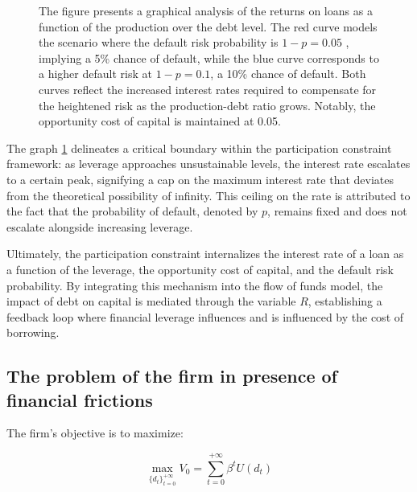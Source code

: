 \documentclass[12pt]{report}
\begin{document}
\begin{figure}
    \caption{The figure presents a graphical analysis of the returns on loans as a function of the production over the
    debt level. The red curve models the scenario where the default risk probability is 
    \(1-p=0.05\)
    , implying a 5\% chance of default, while the blue curve corresponds to a higher default risk at 
    \(1-p=0.1\), a 10\% chance of default. Both curves reflect the increased interest rates required to compensate for
    the heightened risk as the production-debt ratio grows. Notably, the opportunity cost of capital is maintained at 0.05.
    }
    \label{plot:part_constraint_r_fixlavarge}
\end{figure}
The graph \ref{plot:part_constraint_r_fixlavarge} delineates a critical boundary within the participation constraint framework: as leverage approaches
unsustainable levels, the interest rate escalates to a certain peak, signifying a cap on the maximum interest rate that
deviates from the theoretical possibility of infinity. This ceiling on the rate is attributed to the fact that the
probability of default, denoted by \( p \), remains fixed and does not escalate alongside increasing leverage. 

Ultimately, the participation constraint internalizes the interest rate of a loan as a function of the leverage, the
opportunity cost of capital, and the default risk probability. By integrating this mechanism into the flow of funds
model, the impact of debt on capital is mediated through the variable \( R \), establishing a feedback loop where
financial leverage influences and is influenced by the cost of borrowing. 




\subsection{The problem of the firm in presence of financial frictions}
 The firm's objective is to maximize:

\[
\max_{{\{d_{t}\}}_{t=0}^{+\infty}}V_0 = \sum_{t=0}^{+\infty}{\beta^t U(d_t)}
\]
\end{document}
